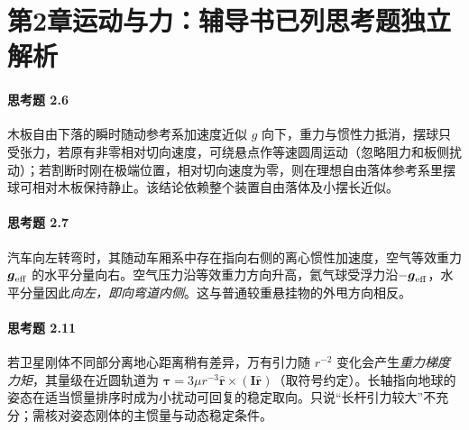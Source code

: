 \section*{第2章\quad 运动与力：辅导书已列思考题独立解析}
\paragraph{思考题 2.6}
木板自由下落的瞬时随动参考系加速度近似 \(g\) 向下，重力与惯性力抵消，摆球只受张力，若原有非零相对切向速度，可绕悬点作等速圆周运动（忽略阻力和板侧扰动）；若割断时刚在极端位置，相对切向速度为零，则在理想自由落体参考系里摆球可相对木板保持静止。该结论依赖整个装置自由落体及小摆长近似。

\paragraph{思考题 2.7}
汽车向左转弯时，其随动车厢系中存在指向右侧的离心惯性加速度，空气等效重力 \(\boldsymbol g_{\rm eff}\) 的水平分量向右。空气压力沿等效重力方向升高，氦气球受浮力沿\(-\boldsymbol g_{\rm eff}\)，水平分量因此\emph{向左，即向弯道内侧}。这与普通较重悬挂物的外甩方向相反。

\paragraph{思考题 2.11}
若卫星刚体不同部分离地心距离稍有差异，万有引力随 \(r^{-2}\) 变化会产生\emph{重力梯度力矩}，其量级在近圆轨道为 \(\boldsymbol\tau=3\mu r^{-3}\hat{\boldsymbol r}\times(\mathbf I\hat{\boldsymbol r})\)（取符号约定）。长轴指向地球的姿态在适当惯量排序时成为小扰动可回复的稳定取向。只说“长杆引力较大”不充分；需核对姿态刚体的主惯量与动态稳定条件。
